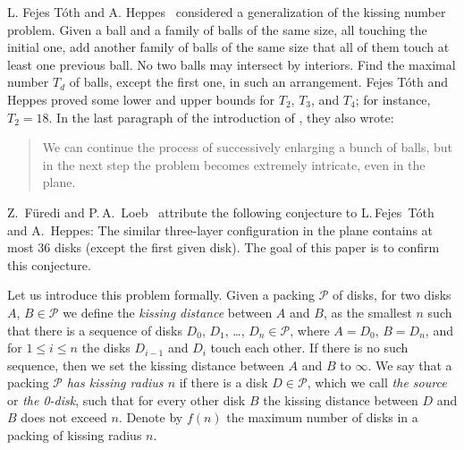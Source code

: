 L. Fejes T\'{o}th and A. Heppes~\cite{toth_heppes} considered a generalization of the kissing number problem. Given a ball and a family of balls of the same size, all touching the initial one, add another family of balls of the same size that all of them touch at least one previous ball. No two balls may intersect by interiors. Find the maximal number $T_d$ of balls, except the first one, in such an arrangement. Fejes T\'{o}th and Heppes proved some lower and upper bounds for $T_2$, $T_3$, and $T_4$; for instance, $T_2 = 18$. In the last paragraph of the introduction of \cite{toth_heppes}, they also wrote:
\begin{quote}
We can continue the process of
successively enlarging a bunch of balls, but in the next step the problem becomes extremely intricate, even in the plane.
\end{quote}
Z.~F\"{u}redi and P.\,A.~Loeb~\cite[last paragraph of Section~6]{furedi} attribute the following conjecture to L.\,Fejes~T\'{o}th and A.~Heppes: The similar three-layer configuration in the plane contains at most $36$ disks (except the first given disk). The goal of this paper is to confirm this conjecture.

Let us introduce this problem formally. Given a packing $\mathcal{P}$ of disks, for two disks $A$, $B\in\mathcal{P}$ we define the \emph{kissing distance} between $A$ and $B$, as the smallest $n$ such that there is a sequence of disks $D_0$, $D_1$, \ldots, $D_n\in\mathcal{P}$, where $A = D_0$, $B = D_n$, and for $1\leq i\leq n$ the disks $D_{i-1}$ and $D_i$ touch each other. If there is no such sequence, then we set the kissing distance between $A$ and $B$ to $\infty$. We say that a packing $\mathcal{P}$ \emph{has kissing radius $n$} if there is a disk $D\in\mathcal{P}$, which we call \emph{the source} or \emph{the 0-disk}, such that for every other disk $B$ the kissing distance between $D$ and $B$ does not exceed $n$. Denote by $f(n)$ the maximum number of disks in a packing of kissing radius $n$.


